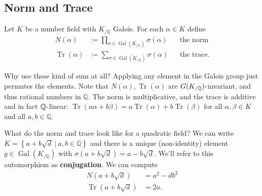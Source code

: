 \hypertarget{norm-and-trace}{%
\subsection{Norm and Trace}\label{norm-and-trace}}

\begin{definition}

Let \(K\) be a number field with \(K_{/{\mathbb{Q}}}\) Galois. For each
\(\alpha\in K\) define
\begin{align*}
N(\alpha) &\coloneqq\prod_{\sigma\in \operatorname{Gal}(K_{/{\mathbb{Q}}})} \sigma(\alpha) && \text{the norm} \\
\operatorname{Tr}(\alpha) &\coloneqq\sum_{\sigma\in \operatorname{Gal}(K_{/{\mathbb{Q}}})} \sigma(\alpha) && \text{the trace}
.\end{align*}

\end{definition}

\begin{remark}

Why use these kind of sum at all? Applying any element in the Galois
group just permutes the elements. Note that
\(N( \alpha), \operatorname{Tr}( \alpha)\) are
\(G(K_{/{\mathbb{Q}}}){\hbox{-}}\)invariant, and thus rational numbers
in \({\mathbb{Q}}\). The norm is multiplicative, and the trace is
additive and in fact \({\mathbb{Q}}{\hbox{-}}\)linear:
\(\operatorname{Tr}(a \alpha + b \beta) = a \operatorname{Tr}( \alpha) + b \operatorname{Tr}( \beta)\)
for all \(\alpha, \beta\in K\) and all \(a,b \in {\mathbb{Q}}\).

\end{remark}

\begin{remark}

What do the norm and trace look like for a quadratic field? We can write
\(K = \left\{{a + b \sqrt d {~\mathrel{\Big|}~}a,b \in {\mathbb{Q}}}\right\}\)
and there is a unique (non-identity) element
\(g\in \operatorname{Gal}(K_{/{\mathbb{Q}}})\) with
\(\sigma(a + b \sqrt d) = a - b \sqrt{d}\). We'll refer to this
automorphism as \textbf{conjugation}. We can compute
\begin{align*}
N(a + b \sqrt{d} ) &= a^2 - db^2 \\
\operatorname{Tr}(a + b \sqrt{d} ) &= 2a
.\end{align*}

\end{remark}

